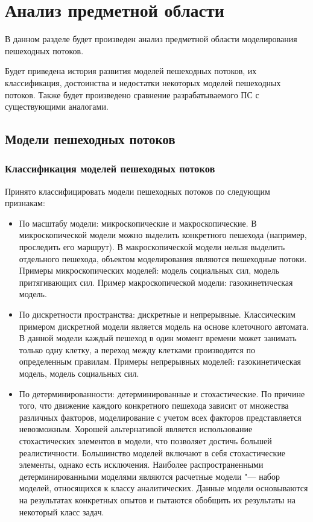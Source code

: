 \section{Анализ предметной области}
\label{sec:domain}

В данном разделе будет произведен анализ предметной области моделирования пешеходных потоков.

Будет приведена история развития моделей пешеходных потоков, их классификация, достоинства и недостатки некоторых моделей пешеходных потоков.
Также будет произведено сравнение разрабатываемого ПС с существующими аналогами.

\subsection{Модели пешеходных потоков}
\label{sub:domain:models}

\subsubsection{Классификация моделей пешеходных потоков}
\label{sub:domain:models:classification}

Принято классифицировать модели пешеходных потоков по следующим признакам:

\begin{itemize}
  \item По масштабу модели: микроскопические и макроскопические.
        В микроскопической модели можно выделить конкретного пешехода (например, проследить его маршрут).
        В макроскопической модели нельзя выделить отдельного пешехода, объектом моделирования являются пешеходные потоки.
        Примеры микроскопических моделей: модель социальных сил, модель притягивающих сил.
        Пример макроскопической модели: газокинетическая модель.
  \item По дискретности пространства: дискретные и непрерывные.
        Классическим примером дискретной модели является модель на основе клеточного автомата.
        В данной модели каждый пешеход в один момент времени может занимать только одну клетку, а переход между клетками производится по определенным правилам.
        Примеры непрерывных моделей: газокинетическая модель, модель социальных сил.
  \item По детерминированности: детерминированные и стохастические.
        По причине того, что движение каждого конкретного пешехода зависит от множества различных факторов, моделирование с учетом всех факторов представляется невозможным.
        Хорошей альтернативой является использование стохастических элементов в модели, что позволяет достичь большей реалистичности.
        Большинство моделей включают в себя стохастические элементы, однако есть исключения.
        Наиболее распространенными детерминированными моделями являются расчетные модели "--- набор моделей, относящихся к классу аналитических.
        Данные модели основываются на результатах конкретных опытов и пытаются обобщить их результаты на некоторый класс задач.
\end{itemize}

